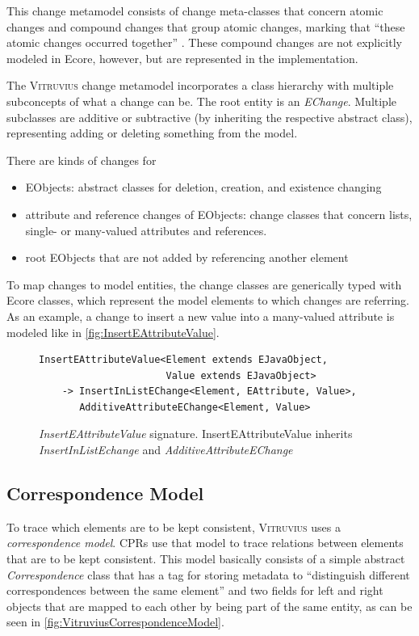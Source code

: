 This change metamodel consists of change meta-classes that concern atomic changes and compound changes that group atomic changes, marking that \enquote{these atomic changes occurred together} \cite{kramer_specification_2017}. 
These compound changes are not explicitly modeled in Ecore, however, but are represented in the implementation.

The \textsc{Vitruvius} change metamodel incorporates a class hierarchy with multiple subconcepts of what a change can be.
The root entity is an \emph{EChange}.
Multiple subclasses are additive or subtractive (by inheriting the respective abstract class),
representing adding or deleting something from the model.

There are kinds of changes for 
\begin{itemize}
    \item EObjects: abstract classes for deletion, creation, and existence changing
    \item attribute and reference changes of EObjects: change classes that concern lists, single- or many-valued attributes and references.
    \item root EObjects that are not added by referencing another element
\end{itemize}
To map changes to model entities, the change classes are generically typed with Ecore classes, which represent the model elements to which changes are referring.
As an example, a change to insert a new value into a many-valued attribute is modeled like in \autoref{fig:InsertEAttributeValue}.

\begin{figure}[h]
\centering
\begin{lstlisting}
InsertEAttributeValue<Element extends EJavaObject, 
                      Value extends EJavaObject> 
    -> InsertInListEChange<Element, EAttribute, Value>,
       AdditiveAttributeEChange<Element, Value>
\end{lstlisting}
\caption[\emph{InsertEAttributeValue} signature]{\emph{InsertEAttributeValue} signature. InsertEAttributeValue inherits \emph{InsertInListEchange} and \emph{AdditiveAttributeEChange}}
\label{fig:InsertEAttributeValue}
\end{figure}

\subsection{Correspondence Model}
\label{subsec:Foundations:Vitruvius:CorrespondenceModel}
To trace which elements are to be kept consistent, \textsc{Vitruvius} uses a \emph{correspondence model}. CPRs use that model to trace relations between elements that are to be kept consistent.
This model basically consists of a simple abstract \emph{Correspondence} class that has a tag for storing metadata to \enquote{distinguish different correspondences between the same element} \cite{VitruviusKlare2021} and two fields for left and right objects that are mapped to each other by being part of the same entity, as can be seen in \autoref{fig:VitruviusCorrespondenceModel}.

